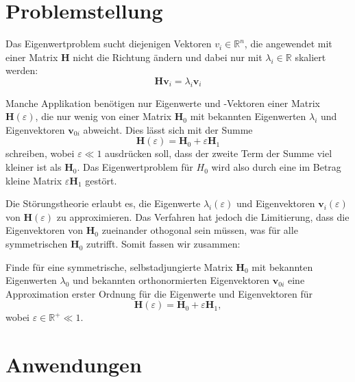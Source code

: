 %
%
\section{Problemstellung
\label{ew:section:problemstellung}}

Das Eigenwertproblem sucht diejenigen Vektoren $v_i \in \mathbb{R}^{n} $, die angewendet mit einer Matrix $\bm H$ nicht die Richtung ändern und dabei nur mit $\lambda_i \in \mathbb{R}$ skaliert werden:
\begin{equation}
    \bm H \bm v_i = \lambda_i \bm v_i \label{ew:eq:eig}
\end{equation}

Manche Applikation benötigen nur Eigenwerte und -Vektoren einer Matrix $\bm H(\varepsilon)$, die nur wenig von einer Matrix $\bm H_0$ mit bekannten Eigenwerten $\lambda_{i}$ und Eigenvektoren $\bm v_{0i}$ abweicht.
Dies lässt sich mit der Summe
\begin{equation}
    \bm H(\varepsilon) = \bm H_0 + \varepsilon \bm H_1
\end{equation}
schreiben, wobei $\varepsilon \ll 1 $ ausdrücken soll, dass der zweite Term der Summe viel kleiner ist als $\bm H_0$.
Das Eigenwertproblem für $H_0$ wird also durch eine im Betrag kleine Matrix $ \varepsilon \bm H_1$ gestört.

Die Störungstheorie erlaubt es, die Eigenwerte $\lambda_i(\varepsilon)$ und Eigenvektoren  $\bm v_i(\varepsilon)$ von $\bm H(\varepsilon)$ zu approximieren.
Das Verfahren hat jedoch die Limitierung, dass die Eigenvektoren von $\bm H_0$ zueinander othogonal sein müssen, was für alle symmetrischen $\bm H_0$ zutrifft.
Somit fassen wir zusammen:
\begin{ewproblem}
Finde für eine symmetrische, selbstadjungierte Matrix $\bm H_0$ mit bekannten Eigenwerten $\lambda_{0}$ und bekannten orthonormierten Eigenvektoren $\bm v_{0i}$ eine Approximation erster Ordnung für die Eigenwerte und Eigenvektoren für
\begin{equation*}
    \bm H(\varepsilon) = \bm H_0 + \varepsilon \bm H_1,
\end{equation*}
wobei $\varepsilon \in \mathbb{R^+} \ll 1$.
\end{ewproblem}

\section{Anwendungen}

